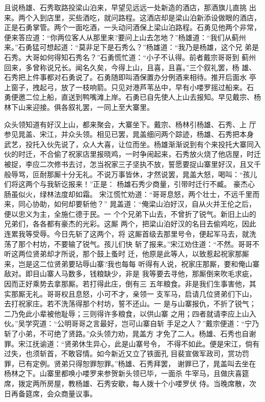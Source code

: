 且说杨雄、石秀取路投梁山泊来，早望见远远一处新造的酒店，那酒旗儿直挑
出来。两个入到店里，买些酒吃，就问路程。这酒店却是梁山泊新添设做眼的酒店，
正是石勇掌管。两个一面吃酒，一头动问酒保上梁山泊路程。石勇见他两个非常，
便来答应道：“你两位客人从那里来?要问上山去怎地？”杨雄道：“我们从蓟州
来。”石勇猛可想起道：“莫非足下是石秀么？”杨雄道：“我乃是杨雄，这个兄
弟是石秀。大哥如何得知石秀名？”石勇慌忙道：“小子不认得。前者戴宗哥哥到
蓟州回来，多曾称说兄长。闻名久矣，今得上山，且喜，且喜。”三个叙礼罢，杨
雄、石秀把上件事都对石勇说了。石勇随即叫酒保置办分例酒来相待。推开后面水
亭上窗子，拽起弓，放了一枝响箭。只见对港芦苇丛中，早有小喽罗摇过船来。石
勇便邀二位上船，直送到鸭嘴滩上岸。石勇已自先使人上山去报知。早见戴宗、杨
林下山来迎接。俱各叙礼罢，一同上至大寨里。

众头领知道有好汉上山，都来聚会，大寨坐下。戴宗、杨林引杨雄、石秀、上
厅参见晁盖、宋江，并众头领。相见已罢，晁盖细问两个踪迹，杨雄、石秀把本身
武艺，投托入伙先说了，众人大喜，让位而坐。杨雄渐渐说到有个来投托大寨同入
伙的时迁，不合偷了祝家店里报晓鸡，一时争闹起来，石秀放火烧了他店屋，时迁
被捉，李应二次修书去讨，怎当祝家三子坚执不放，誓愿要捉山寨里好汉，且又千
般辱骂，叵耐那厮十分无礼。不说万事皆休，才然说罢，晁盖大怒，喝叫：“孩儿
们将这两个与我斩讫报来！”正是：
杨雄石秀少商量，引带时迁行不臧。
豪杰心肠虽似火，绿林法度却如霜。
宋江慌忙劝道：“哥哥息怒，两个壮士，不远千里而来，同心协助，如何却要斩他？”
晁盖道：“俺梁山泊好汉，自从火并王伦之后，便以忠义为主，全施仁德于民。一
个个兄弟下山去，不曾折了锐气。新旧上山的兄弟们，各各都有豪杰的光彩。这厮
两个，把梁山泊好汉的名目去偷鸡吃，因此连累我等受辱。今日先斩了这两个，将
这厮首级去那里号令，便起军马去，就洗荡了那个村坊，不要输了锐气。孩儿们快
斩了报来。”宋江劝住道：“不然。哥哥不听这两位贤弟却才所说，那个鼓上蚤时
迁，他原是此等人，以致惹起祝家那厮来，岂是这二位贤弟要玷辱山寨?我也每每
听得有人说，祝家庄那厮，要和俺山寨敌对。即目山寨人马数多，钱粮缺少，非是
我等要去寻他，那厮倒来吹毛求疵，因而正好乘势去拿那厮。若打得此庄，倒有三
五年粮食。非是我们生事害他，其实那厮无礼。哥哥权且息怒，小可不才，亲领一
支军马，启请几位贤弟们下山，去打祝家庄。若不洗荡得那个村坊，誓不还山。一
是与山寨报仇，不折了锐气；二乃免此小辈被他耻辱；三则得许多粮食，以供山寨
之用；四者就请李应上山入伙。”吴学究道：“公明哥哥之言最好，岂可山寨自斩
手足之人？”戴宗便道：“宁乃斩了小弟，不可绝了贤路。”众头领力劝，晁盖方
才免了二人。杨雄、石秀也自谢罪。宋江抚谕道：“贤弟休生异心，此是山寨号令，
不得不如此。便是宋江，倘有过失，也须斩首，不敢容情。如今新近又立了铁面孔
目裴宣做军政司，赏功罚罪，已有定例。贤弟只得恕罪恕罪。”杨雄、石秀拜罢，
谢罪已了，晁盖叫去坐在杨林之下。山寨里都唤小喽罗来参贺新头领已毕，一面杀
牛宰马，且做庆喜筵席，拨定两所房屋，教杨雄、石秀安歇，每人拨十个小喽罗伏
侍。当晚席散，次日再备筵席，会众商量议事。

